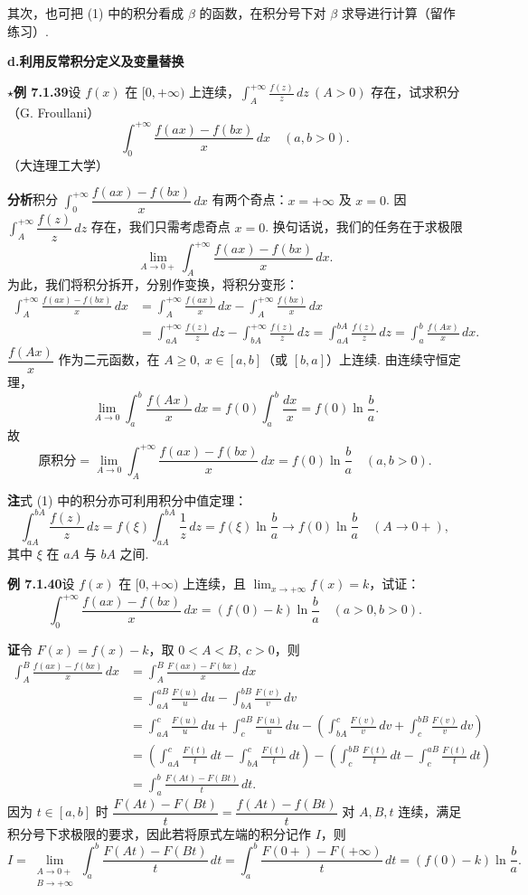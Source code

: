 \documentclass[UTF8, 12pt, fontset=fandol, oneside]{ctexart}
\begin{document}
其次，也可把 (1) 中的积分看成 $\beta$ 的函数，在积分号下对 $\beta$ 求导进行计算（留作练习）.

\noindent\textbf{d.\quad 利用反常积分定义及变量替换}

\noindent\textbf{$\star$例 7.1.39}\quad 设 $f(x)$ 在 $[0,+\infty)$ 上连续，$\displaystyle\int_A^{+\infty}\frac{f(z)}z\,dz\ (A>0)$ 存在，试求积分（G. Froullani）
\[
\int_0^{+\infty}\frac{f(ax)-f(bx)}x\,dx\quad(a,b>0).
\]
（大连理工大学）

\noindent\textbf{分析}\quad 积分 $\displaystyle\int_0^{+\infty}\dfrac{f(ax)-f(bx)}x\,dx$ 有两个奇点：$x=+\infty$ 及 $x=0$. 因 $\displaystyle\int_A^{+\infty}\dfrac{f(z)}z\,dz$ 存在，我们只需考虑奇点 $x=0$. 换句话说，我们的任务在于求极限
\[
\lim_{A\to0+}\int_A^{+\infty}\frac{f(ax)-f(bx)}x\,dx.
\]
为此，我们将积分拆开，分别作变换，将积分变形：
\[
\begin{aligned}
\int_A^{+\infty}\frac{f(ax)-f(bx)}x\,dx
&=\int_A^{+\infty}\frac{f(ax)}x\,dx-\int_A^{+\infty}\frac{f(bx)}x\,dx\\
&=\int_{aA}^{+\infty}\frac{f(z)}z\,dz-\int_{bA}^{+\infty}\frac{f(z)}z\,dz
=\int_{aA}^{bA}\frac{f(z)}z\,dz
=\int_a^b\frac{f(Ax)}x\,dx.
\end{aligned}
\tag{1}
\]
$\dfrac{f(Ax)}x$ 作为二元函数，在 $A\ge0,\ x\in[a,b]$（或 $[b,a]$）上连续. 由连续守恒定理，
\[
\lim_{A\to0}\int_a^b\frac{f(Ax)}x\,dx
=f(0)\int_a^b\frac{dx}{x}=f(0)\ln\frac ba.
\]
故
\[
\text{原积分}=\lim_{A\to0}\int_A^{+\infty}\frac{f(ax)-f(bx)}x\,dx
=f(0)\ln\frac ba\quad(a,b>0).
\]

\noindent\textbf{注}\quad 式 (1) 中的积分亦可利用积分中值定理：
\[
\int_{aA}^{bA}\frac{f(z)}z\,dz
=f(\xi)\int_{aA}^{bA}\frac1z\,dz
=f(\xi)\ln\frac ba\to f(0)\ln\frac ba\quad(A\to0+),
\]
其中 $\xi$ 在 $aA$ 与 $bA$ 之间.

\noindent\textbf{例 7.1.40}\quad 设 $f(x)$ 在 $[0,+\infty)$ 上连续，且 $\displaystyle\lim_{x\to+\infty}f(x)=k$，试证：
\[
\int_0^{+\infty}\frac{f(ax)-f(bx)}x\,dx
=(f(0)-k)\ln\frac ba\quad(a>0,b>0).
\]

\noindent\textbf{证}\quad 令 $F(x)=f(x)-k$，取 $0<A<B,\ c>0$，则
\[
\begin{aligned}
\int_A^B\frac{f(ax)-f(bx)}x\,dx
&=\int_A^B\frac{F(ax)-F(bx)}x\,dx\\
&=\int_{aA}^{aB}\frac{F(u)}u\,du-\int_{bA}^{bB}\frac{F(v)}v\,dv\\
&=\int_{aA}^c\frac{F(u)}u\,du+\int_c^{aB}\frac{F(u)}u\,du
-\left(\int_{bA}^c\frac{F(v)}v\,dv+\int_c^{bB}\frac{F(v)}v\,dv\right)\\
&=\left(\int_{aA}^c\frac{F(t)}t\,dt-\int_{bA}^c\frac{F(t)}t\,dt\right)
-\left(\int_c^{bB}\frac{F(t)}t\,dt-\int_c^{aB}\frac{F(t)}t\,dt\right)\\
&=\int_a^b\frac{F(At)-F(Bt)}t\,dt.
\end{aligned}
\]
因为 $t\in[a,b]$ 时 $\dfrac{F(At)-F(Bt)}t=\dfrac{f(At)-f(Bt)}t$ 对 $A,B,t$ 连续，满足积分号下求极限的要求，因此若将原式左端的积分记作 $I$，则
\[
I=\lim_{\substack{A\to0+\\ B\to+\infty}}\int_a^b\frac{F(At)-F(Bt)}t\,dt
=\int_a^b\frac{F(0+)-F(+\infty)}t\,dt
=(f(0)-k)\ln\frac ba.
\]
\end{document}
